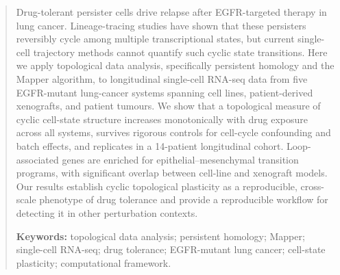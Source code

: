 \begin{abstract}
\noindent
Drug-tolerant persister cells drive relapse after EGFR-targeted
therapy in lung cancer. Lineage-tracing studies have shown that these
persisters reversibly cycle among multiple transcriptional states, but
current single-cell trajectory methods cannot quantify such cyclic
state transitions.
Here we apply topological data analysis, specifically persistent
homology and the Mapper algorithm, to longitudinal single-cell
RNA-seq data from five EGFR-mutant lung-cancer systems spanning cell
lines, patient-derived xenografts, and patient tumours. We show that
a topological measure of cyclic cell-state structure increases
monotonically with drug exposure across all systems, survives
rigorous controls for cell-cycle confounding and batch effects, and
replicates in a 14-patient longitudinal cohort.
Loop-associated genes are enriched for epithelial--mesenchymal
transition programs, with significant overlap between cell-line and
xenograft models. Our results establish cyclic topological
plasticity as a reproducible, cross-scale phenotype of drug
tolerance and provide a reproducible workflow for detecting it in
other perturbation contexts.

\vspace{0.5em}
\noindent\textbf{Keywords:} topological data analysis; persistent homology;
Mapper; single-cell RNA-seq; drug tolerance; EGFR-mutant lung cancer;
cell-state plasticity; computational framework.
\end{abstract}
